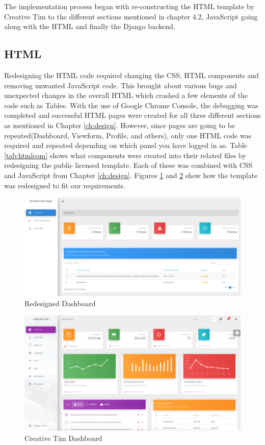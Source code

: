 \documentclass[../main.tex]{subfiles}
\begin{document}
\raggedright
The implementation process began with re-constructing the HTML template by Creative Tim\cite{creativeTimTemplate} to the different sections mentioned in chapter 4.2, JavaScript going along with the HTML and finally the Django backend.

\subsection{HTML}
Redesigning the HTML code required changing the CSS, HTML components and removing unwanted JavaScript code. This brought about various bugs and unexpected changes in the overall HTML which crashed a few elements of the code such as Tables. With the use of Google Chrome Console, the debugging was completed and successful HTML pages were created for all three different sections as mentioned in Chapter \ref{ch:design}. However, since pages are going to be repeated(Dashboard, Viewform, Profile, and others), only one HTML code was required and repeated depending on which panel you have logged in as. Table \ref{tab:htmlcom} shows what components were created into their related files by redesigning the public licensed template. Each of these was combined with CSS and JavaScript from Chapter \ref{ch:design}. Figures \ref{fig:dash} and \ref{fig:ctdash} show how the template was redesigned to fit our requirements. 

\begin{figure}[H]
        \includegraphics[scale=0.5]
        {images/dash.png}
        \caption{\label{fig:dash} Redesigned Dashboard}
      \end{figure}
      
\begin{figure}[H]
        \includegraphics[scale=0.5]
        {images/ctdash.png}
        \caption{\label{fig:ctdash} Creative Tim Dashboard}
      \end{figure}      
\end{document}
